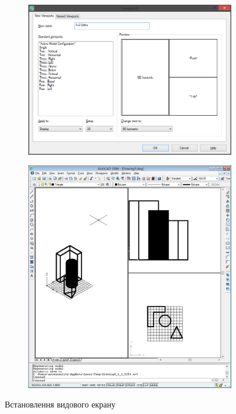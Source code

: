 \documentclass[
	a4paper,
	oneside,
	BCOR = 10mm,
	DIV = 12,
	12pt,
	headings = normal,
]{scrartcl}
\newlength{\gridunitwidth}
\begin{document}
			\begin{figure}[!htbp]
				\begin{subfigure}[t]{4 \gridunitwidth}
					\includegraphics[width = \columnwidth]{./assets/p11.png}
					\caption{}
					\label{subfig:04-viewports-01}
				\end{subfigure}%
				\hspace{2 \gridunitwidth}%
				\begin{subfigure}[t]{4 \gridunitwidth}
					\centering
					\includegraphics[width = \columnwidth]{./assets/p12.png}
					\caption{}
					\label{subfig:04-viewports-02}
				\end{subfigure}
				\caption{Встановлення видового екрану}
				\label{fig:04-viewports}
			\end{figure}
\end{document}
